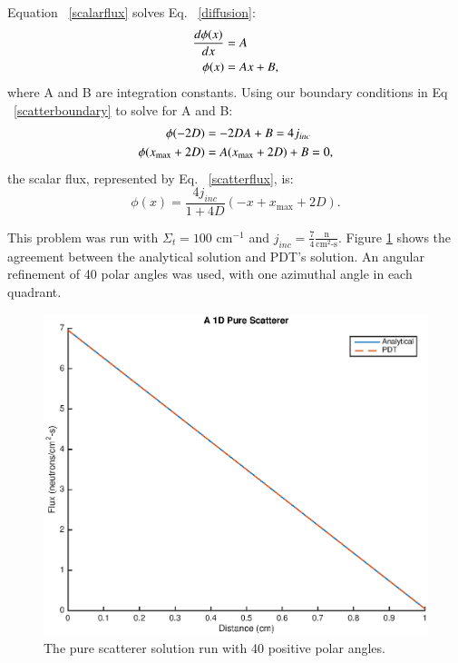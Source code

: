 \documentclass{anstrans}
\begin{document}
Equation ~\eqref{scalarflux} solves Eq. ~\eqref{diffusion}:
\begin{align}
\frac{d\phi(x)}{dx} &= A \notag \\
\phi(x) &= Ax + B,
\label{scalarflux}
\end{align}
where A and B are integration constants. Using our boundary conditions in Eq ~\eqref{scatterboundary} to solve for A and B:
\begin{align}
\phi(-2D) &= -2DA + B = 4j_{inc} \notag \\
\phi(x_{\text{max}} + 2D) &= A(x_{\text{max}} + 2D) + B = 0, \notag
\label{notimportant}
\end{align}
the scalar flux, represented by Eq. ~\eqref{scatterflux}, is:
\begin{equation}
\phi(x) = \frac{4j_{inc}}{1+4D}(-x + x_{\text{max}} + 2D).
\label{scatterflux}
\end{equation}

This problem was run with $\Sigma_t = 100 \text{ cm}^{-1}$ and $j_{inc} = \frac{7}{4} \frac{\text{n}}{\text{cm}^2\text{-s}}$. Figure \ref{scattersoln} shows the agreement between the analytical solution and PDT's solution. An angular refinement of 40 polar angles was used, with one azimuthal angle in each quadrant.

\begin{figure}
\centering
\includegraphics[scale = 0.5]{figures/PureScatterer.eps}
\caption{The pure scatterer solution run with 40 positive polar angles.}
\label{scattersoln}
\end{figure}
\end{document}
